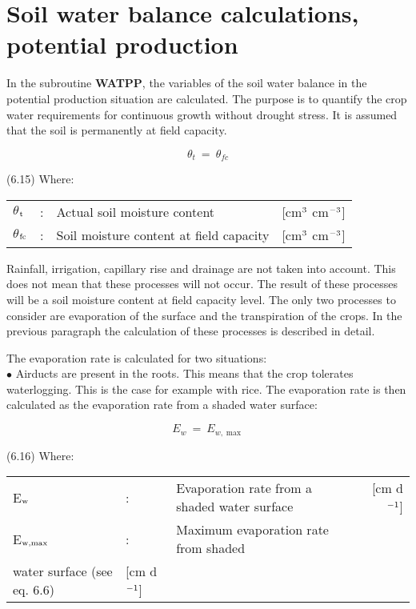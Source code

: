 \section{Soil water balance calculations, potential pro\-duction  }

In the subroutine {\bf WATPP}, the variables of the soil water balance in the potential produc\-tion situation are calculated. The purpose is to quantify the crop water requirements for
continuous growth without drought stress. It is assumed that the soil is permanent\-ly at
field capacity.

\begin{equation}
\theta  _{t} ~ =~\theta  _{fc} 
\end{equation}

 
\strut\hfill (6.15)
Where:\\
\begin{tabularx}{\textwidth}{llXr}



 $\theta$$_{{\rm t}}$ &:& Actual soil moisture content & [cm$^{{\rm 3}}$ cm$^{{\rm -3}}$]\\
 $\theta$$_{{\rm fc}}$ &:& Soil moisture content at field capacity & [cm$^{{\rm 3}}$ cm$^{{\rm -3}}$]
\end{tabularx}

 
Rainfall, irrigation, capillary rise and drainage are not taken into account. This does not
mean that these processes will not occur. The result of these processes will be a soil
moisture content at field capacity level. The only two processes to consider are evapora\-tion of the surface and the transpiration of the crops. In the previous paragraph the
calculation of these processes is described in detail.



The evaporation rate is calculated for two situations:\\
$\bullet$ Airducts are present in the roots. This means that the crop tolerates waterlog\-ging. This
is the case for example with rice. The evaporation rate is then calculated as the evapora\-tion rate from a shaded water surface:

\begin{equation}
E _{w} ~=~ E _{w, \max } 
\end{equation}

 
\strut\hfill (6.16)
Where:\\
\begin{tabularx}{\textwidth}{llXr}



 E$_{{\rm w}}$ &:& Evaporation rate from a shaded water surface & [cm d$^{{\rm -1}}$]\\
 E$_{{\rm w,max}}$ &:& Maximum evaporation rate from shaded \\
    water surface (see eq. 6.6) & [cm d$^{{\rm -1}}$]
\end{tabularx}

